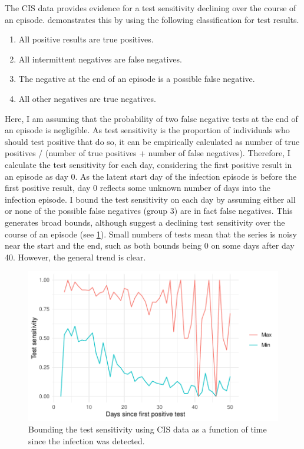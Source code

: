 \documentclass[thesis.tex]{subfiles}
\begin{document}
The CIS data provides evidence for a test sensitivity declining over the course of an episode.
 demonstrates this by using the following classification for test results.
\begin{enumerate}
    \item All positive results are true positives.
    \item All intermittent negatives are false negatives.
    \item The negative at the end of an episode is a possible false negative.
    \item All other negatives are true negatives.
\end{enumerate}
Here, I am assuming that the probability of two false negative tests at the end of an episode is negligible.
As test sensitivity is the proportion of individuals who should test positive that do so, it can be empirically calculated as number of true positives / (number of true positives + number of false negatives).
Therefore, I calculate the test sensitivity for each day, considering the first positive result in an episode as day 0.
As the latent start day of the infection episode is before the first positive result, day 0 reflects some unknown number of days into the infection episode.
I bound the test sensitivity on each day by assuming either all or none of the possible false negatives (group 3) are in fact false negatives.
This generates broad bounds, although suggest a declining test sensitivity over the course of an episode (see \cref{imperf-test:fig:bounding-cis-sensitivity}).
Small numbers of tests mean that the series is noisy near the start and the end, such as both bounds being 0 on some days after day 40.
However, the general trend is clear.
\begin{figure}
  \includegraphics{cis-imperfect-testing/test-sens-bound}
  \caption[Bounding test sensitivity using CIS data]{
    Bounding the test sensitivity using CIS data as a function of time since the infection was detected.
  }
  \label{imperf-test:fig:bounding-cis-sensitivity}
\end{figure}
\end{document}

